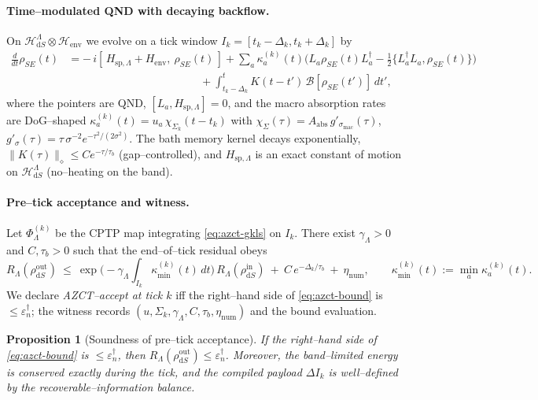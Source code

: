 \documentclass[10pt]{article}
\theoremstyle{definition}
\theoremstyle{plain}
\newtheorem{proposition}{Proposition}[section]
\begin{document}
\paragraph{Time--modulated QND with decaying backflow.}\label{par:uom-main-198}
On $\mathcal H_{\mathrm dS}^{\Lambda}\otimes\mathcal H_{\mathrm{env}}$ we evolve on a tick window $I_k=[t_k-\Delta_k,t_k+\Delta_k]$ by
\begin{align}
\frac{d}{dt}\rho_{SE}(t)
&=-\,i[\,H_{\mathrm{sp},\Lambda}+H_{\mathrm{env}},\ \rho_{SE}(t)\,]
+\sum_a\kappa_a^{(k)}(t)\Big( L_a\rho_{SE}(t)L_a^\dagger - \tfrac12\{L_a^\dagger L_a,\rho_{SE}(t)\}\Big)
\label{eq:azct-gkls}\\[-0.5em]
&\qquad\qquad\qquad\qquad\qquad\qquad+ \int_{t_k-\Delta_k}^{t}\! K(t-t')\,\mathcal B[\rho_{SE}(t')]\,dt',
\nonumber
\end{align}
where the pointers are QND, $[L_a,H_{\mathrm{sp},\Lambda}]=0$, and the macro absorption rates are DoG--shaped
$\kappa_a^{(k)}(t)=u_a\,\chi_{\Sigma_k}(t-t_k)$ with $\chi_{\Sigma}(\tau)=A_{\mathrm{abs}}\,g'_{\sigma_{\mathrm{mac}}}(\tau)$, $g'_\sigma(\tau)=\tau\,\sigma^{-2} e^{-\tau^2/(2\sigma^2)}$.
The bath memory kernel decays exponentially, $\|K(\tau)\|_\diamond\le C e^{-\tau/\tau_b}$ (gap--controlled),
and $H_{\mathrm{sp},\Lambda}$ is an exact constant of motion on $\mathcal H_{\mathrm dS}^\Lambda$ (no--heating on the band).

\paragraph{Pre--tick acceptance and witness.}\label{par:uom-main-199}
Let $\Phi_\Lambda^{(k)}$ be the CPTP map integrating \eqref{eq:azct-gkls} on $I_k$.
There exist $\gamma_\Lambda>0$ and $C,\tau_b>0$ such that the end--of--tick residual obeys
\begin{equation}
\label{eq:azct-bound}
R_\Lambda(\rho_{\mathrm dS}^{\mathrm{out}})
\ \le\ \exp\!\Big(-\gamma_\Lambda\!\int_{I_k}\kappa_{\min}^{(k)}(t)\,dt\Big)\,
R_\Lambda(\rho_{\mathrm dS}^{\mathrm{in}})\ +\ C\,e^{-\Delta_k/\tau_b}\ +\ \eta_{\mathrm{num}},
\qquad \kappa_{\min}^{(k)}(t):=\min_a \kappa_a^{(k)}(t).
\end{equation}
We declare \emph{AZCT--accept at tick $k$} iff the right--hand side of \eqref{eq:azct-bound} is $\le \varepsilon_n^\dagger$;
the witness records $(u,\Sigma_k,\gamma_\Lambda,C,\tau_b,\eta_{\mathrm{num}})$ and the bound evaluation.

\begin{proposition}[Soundness of pre--tick acceptance]
\label{prop:azct-sound}
If the right--hand side of \eqref{eq:azct-bound} is $\le \varepsilon_n^\dagger$, then $R_\Lambda(\rho_{\mathrm dS}^{\mathrm{out}})\le \varepsilon_n^\dagger$.
Moreover, the band--limited energy is conserved exactly during the tick, and the compiled payload $\Delta I_k$ is well--defined by the recoverable--information balance.
\end{proposition}
\end{document}
